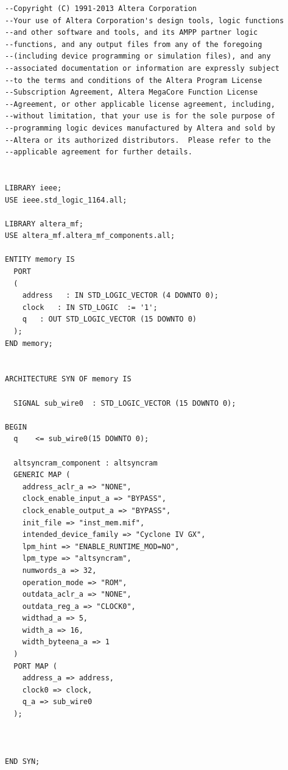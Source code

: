 \documentclass[11pt]{report}
\begin{document}
\begin{spacing}{1.5}
\begin{lstlisting}
--Copyright (C) 1991-2013 Altera Corporation
--Your use of Altera Corporation's design tools, logic functions 
--and other software and tools, and its AMPP partner logic 
--functions, and any output files from any of the foregoing 
--(including device programming or simulation files), and any 
--associated documentation or information are expressly subject 
--to the terms and conditions of the Altera Program License 
--Subscription Agreement, Altera MegaCore Function License 
--Agreement, or other applicable license agreement, including, 
--without limitation, that your use is for the sole purpose of 
--programming logic devices manufactured by Altera and sold by 
--Altera or its authorized distributors.  Please refer to the 
--applicable agreement for further details.


LIBRARY ieee;
USE ieee.std_logic_1164.all;

LIBRARY altera_mf;
USE altera_mf.altera_mf_components.all;

ENTITY memory IS
  PORT
  (
    address   : IN STD_LOGIC_VECTOR (4 DOWNTO 0);
    clock   : IN STD_LOGIC  := '1';
    q   : OUT STD_LOGIC_VECTOR (15 DOWNTO 0)
  );
END memory;


ARCHITECTURE SYN OF memory IS

  SIGNAL sub_wire0  : STD_LOGIC_VECTOR (15 DOWNTO 0);

BEGIN
  q    <= sub_wire0(15 DOWNTO 0);

  altsyncram_component : altsyncram
  GENERIC MAP (
    address_aclr_a => "NONE",
    clock_enable_input_a => "BYPASS",
    clock_enable_output_a => "BYPASS",
    init_file => "inst_mem.mif",
    intended_device_family => "Cyclone IV GX",
    lpm_hint => "ENABLE_RUNTIME_MOD=NO",
    lpm_type => "altsyncram",
    numwords_a => 32,
    operation_mode => "ROM",
    outdata_aclr_a => "NONE",
    outdata_reg_a => "CLOCK0",
    widthad_a => 5,
    width_a => 16,
    width_byteena_a => 1
  )
  PORT MAP (
    address_a => address,
    clock0 => clock,
    q_a => sub_wire0
  );



END SYN;


\end{lstlisting}
\end{spacing}
\end{document}

